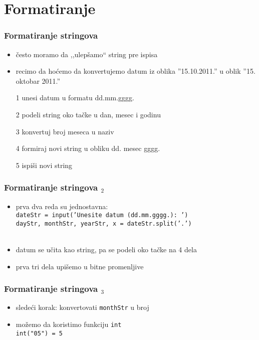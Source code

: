 \documentclass[utf8,compress]{beamer}
\begin{document}
\section{Formatiranje}

\begin{frame}[fragile]
  \frametitle{Formatiranje stringova}
  \begin{itemize}
    \item često moramo da ,,ulepšamo`` string pre ispisa
    \item recimo da hoćemo da konvertujemo datum iz oblika ''15.10.2011.'' u oblik ''15. oktobar 2011.''
    \item[1] unesi datum u formatu dd.mm.gggg.
    \item[2] podeli string oko tačke u dan, mesec i godinu
    \item[3] konvertuj broj meseca u naziv
    \item[4] formiraj novi string u obliku dd. mesec gggg.
    \item[5] ispiši novi string
  \end{itemize}
\end{frame}

\begin{frame}[fragile]
  \frametitle{Formatiranje stringova $_2$}
  \begin{itemize}
    \item prva dva reda su jednostavna: \\
      \texttt{dateStr = input('Unesite datum (dd.mm.gggg.): ')} \\
      \texttt{dayStr, monthStr, yearStr, x = dateStr.split('.')} \\ \ \\ %
    \item datum se učita kao string, pa se podeli oko tačke na 4 dela
    \item prva tri dela upišemo u bitne promenljive
  \end{itemize}
\end{frame}

\begin{frame}[fragile]
  \frametitle{Formatiranje stringova $_3$}
  \begin{itemize}
    \item sledeći korak: konvertovati \texttt{monthStr} u broj
    \item možemo da koristimo funkciju \texttt{int} \\
      \texttt{int("05") = 5}
  \end{itemize}
\end{frame}
\end{document}
